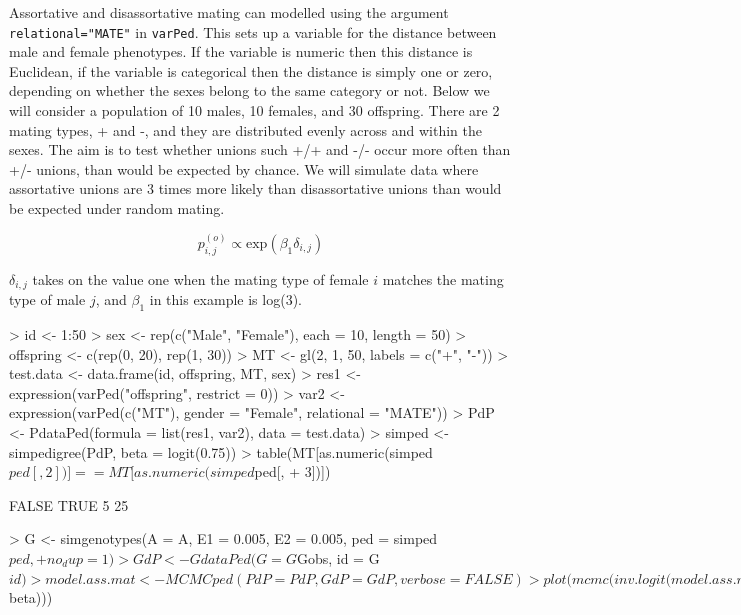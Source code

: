 \documentclass{article}
\begin{document}
Assortative and disassortative mating can modelled using the argument \texttt{relational="MATE"} in \texttt{varPed}. This sets up a variable for the distance between male and female phenotypes.  If the variable is numeric then this distance is Euclidean, if the variable is categorical then the distance is simply one or zero, depending on whether the sexes belong to the same category or not.  Below we will consider a population of 10 males, 10 females, and 30 offspring.  There are 2 mating types, + and -, and they are distributed evenly across and within the sexes.   The aim is to test whether unions such +/+ and -/- occur more often than +/- unions, than would be expected by chance.  We will simulate data where assortative unions are 3 times more likely than disassortative unions than would be expected under random mating.  

\begin{equation}
p^{(o)}_{i,j} \propto \textrm{exp}(\beta_{1}\delta_{i,j})
\label{AM-eq}
\end{equation}

$\delta_{i,j}$ takes on the value one when the mating type of female $i$ matches the mating type of male $j$, and $\beta_{1}$ in this example is log(3).

\begin{Schunk}
\begin{Sinput}
> id <- 1:50
> sex <- rep(c("Male", "Female"), each = 10, length = 50)
> offspring <- c(rep(0, 20), rep(1, 30))
> MT <- gl(2, 1, 50, labels = c("+", "-"))
> test.data <- data.frame(id, offspring, MT, sex)
> res1 <- expression(varPed("offspring", restrict = 0))
> var2 <- expression(varPed(c("MT"), gender = "Female", relational = "MATE"))
> PdP <- PdataPed(formula = list(res1, var2), data = test.data)
> simped <- simpedigree(PdP, beta = logit(0.75))
> table(MT[as.numeric(simped$ped[, 2])] == MT[as.numeric(simped$ped[, 
+     3])])
\end{Sinput}
\begin{Soutput}
FALSE  TRUE 
    5    25 
\end{Soutput}
\begin{Sinput}
> G <- simgenotypes(A = A, E1 = 0.005, E2 = 0.005, ped = simped$ped, 
+     no_dup = 1)
> GdP <- GdataPed(G = G$Gobs, id = G$id)
> model.ass.mat <- MCMCped(PdP = PdP, GdP = GdP, verbose = FALSE)
> plot(mcmc(inv.logit(model.ass.mat$beta)))
\end{Sinput}
\end{Schunk}
\end{document}

